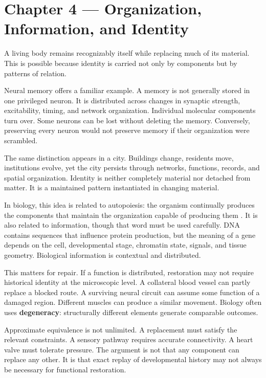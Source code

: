 \chapter{Chapter 4 --- Organization, Information, and Identity}\label{chapter-4-organization-information-and-identity}

A living body remains recognizably itself while replacing much of its material. This is possible because identity is carried not only by components but by patterns of relation.

Neural memory offers a familiar example. A memory is not generally stored in one privileged neuron. It is distributed across changes in synaptic strength, excitability, timing, and network organization. Individual molecular components turn over. Some neurons can be lost without deleting the memory. Conversely, preserving every neuron would not preserve memory if their organization were scrambled.

The same distinction appears in a city. Buildings change, residents move, institutions evolve, yet the city persists through networks, functions, records, and spatial organization. Identity is neither completely material nor detached from matter. It is a maintained pattern instantiated in changing material.

In biology, this idea is related to autopoiesis: the organism continually produces the components that maintain the organization capable of producing them \autocite{maturana1980autopoiesis}. It is also related to information, though that word must be used carefully. DNA contains sequences that influence protein production, but the meaning of a gene depends on the cell, developmental stage, chromatin state, signals, and tissue geometry. Biological information is contextual and distributed.

This matters for repair. If a function is distributed, restoration may not require historical identity at the microscopic level. A collateral blood vessel can partly replace a blocked route. A surviving neural circuit can assume some function of a damaged region. Different muscles can produce a similar movement. Biology often uses \textbf{degeneracy}: structurally different elements generate comparable outcomes.

Approximate equivalence is not unlimited. A replacement must satisfy the relevant constraints. A sensory pathway requires accurate connectivity. A heart valve must tolerate pressure. The argument is not that any component can replace any other. It is that exact replay of developmental history may not always be necessary for functional restoration.

